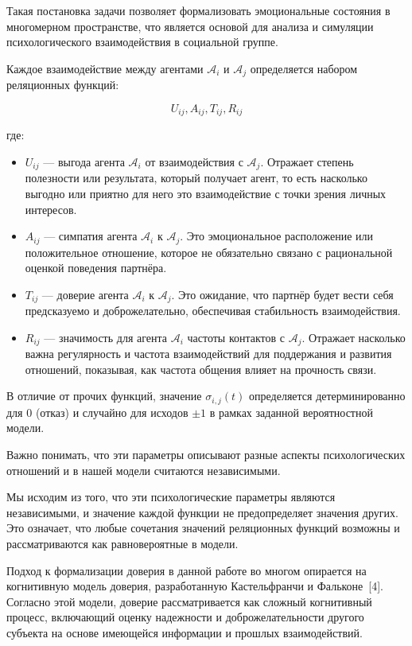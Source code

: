 \documentclass[12pt]{article}
\begin{document}
Такая постановка задачи позволяет формализовать эмоциональные состояния в многомерном пространстве, что является основой для анализа и симуляции психологического взаимодействия в социальной группе.

\bigskip

Каждое взаимодействие между агентами \( \mathcal{A}_i \) и \( \mathcal{A}_j \) определяется набором реляционных функций:

\[
U_{ij}, A_{ij}, T_{ij}, R_{ij} 
\]

где:

\begin{itemize}
    \item \( U_{ij} \) — выгода агента \( \mathcal{A}_i \) от взаимодействия с \( \mathcal{A}_j \). Отражает степень полезности или результата, который получает агент, то есть насколько выгодно или приятно для него это взаимодействие с точки зрения личных интересов.
    \item \( A_{ij} \) — симпатия агента \( \mathcal{A}_i \) к \( \mathcal{A}_j \). Это эмоциональное расположение или положительное отношение, которое не обязательно связано с рациональной оценкой поведения партнёра.
    \item \( T_{ij} \) — доверие агента \( \mathcal{A}_i \) к \( \mathcal{A}_j \). Это ожидание, что партнёр будет вести себя предсказуемо и доброжелательно, обеспечивая стабильность взаимодействия.
    \item \( R_{ij} \) — значимость для агента \( \mathcal{A}_i \) частоты контактов с \( \mathcal{A}_j \). Отражает насколько важна регулярность и частота взаимодействий для поддержания и развития отношений, показывая, как частота общения влияет на прочность связи.
\end{itemize}

В отличие от прочих функций, значение \( \sigma_{i,j}(t) \) определяется детерминированно для \(0\) (отказ) и случайно для исходов \(\pm 1\) в рамках заданной вероятностной модели.

Важно понимать, что эти параметры описывают разные аспекты психологических отношений и в нашей модели считаются независимыми. 


Мы исходим из того, что эти психологические параметры являются независимыми, и значение каждой функции не предопределяет значения других. Это означает, что любые сочетания значений реляционных функций возможны и рассматриваются как равновероятные в модели.


Подход к формализации доверия в данной работе во многом опирается на когнитивную модель доверия, разработанную Кастельфранчи и Фальконе~[4]. Согласно этой модели, доверие рассматривается как сложный когнитивный процесс, включающий оценку надежности и доброжелательности другого субъекта на основе имеющейся информации и прошлых взаимодействий.
\end{document}
